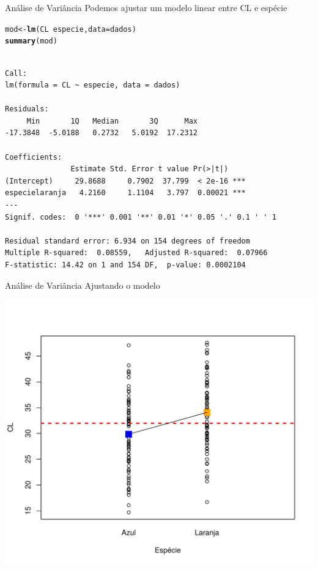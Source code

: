 \documentclass[10pt]{beamer}\usepackage[]{graphicx}\usepackage[]{color}
\makeatletter
\newcommand{\hlopt}[1]{\textcolor[rgb]{0,0,0}{#1}}%
\newcommand{\hlstd}[1]{\textcolor[rgb]{0.345,0.345,0.345}{#1}}%
\newcommand{\hlkwb}[1]{\textcolor[rgb]{0.69,0.353,0.396}{#1}}%
\newcommand{\hlkwc}[1]{\textcolor[rgb]{0.333,0.667,0.333}{#1}}%
\newcommand{\hlkwd}[1]{\textcolor[rgb]{0.737,0.353,0.396}{\textbf{#1}}}%
\newenvironment{kframe}{%
 \def\at@end@of@kframe{}%
 \ifinner\ifhmode%
  \def\at@end@of@kframe{\end{minipage}}%
  \begin{minipage}{\columnwidth}%
 \fi\fi%
 \def\FrameCommand##1{\hskip\@totalleftmargin \hskip-\fboxsep
 \colorbox{shadecolor}{##1}\hskip-\fboxsep
     \hskip-\linewidth \hskip-\@totalleftmargin \hskip\columnwidth}%
 \MakeFramed {\advance\hsize-\width
   \@totalleftmargin\z@ \linewidth\hsize
   \@setminipage}}%
 {\par\unskip\endMakeFramed%
 \at@end@of@kframe}
\newenvironment{knitrout}{}{} %
\theoremstyle{definition}
\makeatother
\begin{document}
\begin{frame}[fragile]{Análise de Variância}
Podemos ajustar um modelo linear entre CL e espécie
\begin{knitrout}\footnotesize
{}\color{fgcolor}\begin{kframe}
\begin{alltt}
\hlstd{mod} \hlkwb{<-} \hlkwd{lm}\hlstd{(CL} \hlopt{~} \hlstd{especie,} \hlkwc{data} \hlstd{= dados)}
\hlkwd{summary}\hlstd{(mod)}
\end{alltt}
\begin{verbatim}

Call:
lm(formula = CL ~ especie, data = dados)

Residuals:
     Min       1Q   Median       3Q      Max 
-17.3848  -5.0188   0.2732   5.0192  17.2312 

Coefficients:
               Estimate Std. Error t value Pr(>|t|)    
(Intercept)     29.8688     0.7902  37.799  < 2e-16 ***
especielaranja   4.2160     1.1104   3.797  0.00021 ***
---
Signif. codes:  0 '***' 0.001 '**' 0.01 '*' 0.05 '.' 0.1 ' ' 1

Residual standard error: 6.934 on 154 degrees of freedom
Multiple R-squared:  0.08559,	Adjusted R-squared:  0.07966 
F-statistic: 14.42 on 1 and 154 DF,  p-value: 0.0002104
\end{verbatim}
\end{kframe}
\end{knitrout}
\end{frame}

\begin{frame}[fragile]{Análise de Variância}
Ajustando o modelo
\begin{knitrout}\footnotesize
{}\color{fgcolor}

{\centering \includegraphics[width=.7\textwidth]{figure/unnamed-chunk-25-1} 

}



\end{knitrout}
\end{frame}
\end{document}
